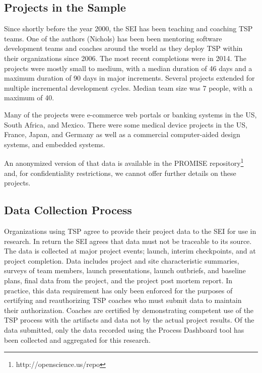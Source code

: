 \subsection{Projects in the Sample}
Since shortly before the year 2000, the SEI has been teaching and coaching TSP teams. One of the authors (Nichols) has been been mentoring software development teams and coaches around the world as they deploy TSP within their organizations since 2006.  The  most recent completions were in 2014.
The projects were mostly small to medium, with a median duration of 46 days and a maximum duration of 90 days in major increments. 
Several projects extended for multiple incremental development cycles. 
Median team size was 7 people, with a maximum of 40. 

Many of the projects were e-commerce web portals or banking systems in the US, South Africa, and Mexico. 
There were  some  medical device projects in  the US, France, Japan, and Germany as well  as a commercial computer-aided design systems, and embedded systems. 

An anonymized version of that data is available in the PROMISE repository\footnote{http://openscience.us/repo}  and,
for confidentiality restrictions, we cannot offer 
further details on these projects.



\subsection{Data Collection Process}
\label{sec:data-collection}

Organizations using TSP agree to provide their project data to the SEI for use in research. In return the SEI agrees    that  data must not be traceable to its source. The data is collected at major project events; launch, interim checkpoints, and at project completion. Data includes project and site  characteristic summaries, surveys of team members, launch presentations, launch outbriefs, and baseline plans, final data from the project, and the project post mortem report.  In practice, this data requirement has only been enforced for the purposes of certifying and reauthorizing TSP coaches who must submit data to maintain their authorization. Coaches are certified by demonstrating competent use of the TSP process with the artifacts and data not by the actual project results.  Of the data submitted, only the data recorded using the Process Dashboard tool has been collected and aggregated for this research. 

